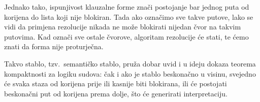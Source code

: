 Jednako tako, ispunjivost klauzalne forme znači postojanje bar jednog puta od korijena do lista koji nije blokiran. Tada ako označimo sve takve putove, lako se vidi da primjena rezolucije nikada ne može blokirati nijedan čvor na takvim putovima. Kad označi sve ostale čvorove, algoritam rezolucije će stati, te ćemo znati da forma nije proturječna.

Takvo stablo, tzv.\ semantičko stablo, pruža dobar uvid i u ideju dokaza teorema kompaktnosti za logiku sudova: čak i ako je stablo beskonačno u visinu, svejedno će svaka staza od korijena prije ili kasnije biti blokirana, ili će postojati beskonačni put od korijena prema dolje, što će generirati interpretaciju.